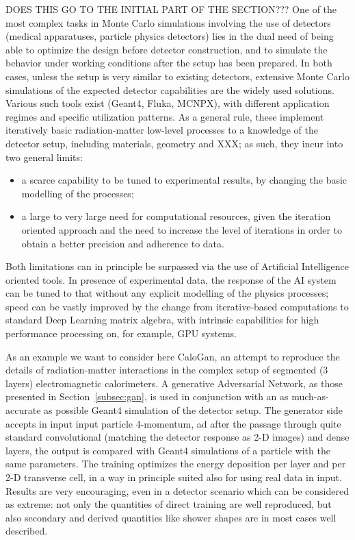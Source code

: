 DOES THIS GO TO THE INITIAL PART OF THE SECTION???
One of the most complex tasks in Monte Carlo simulations involving the use of detectors (medical apparatuses, particle physics detectors) lies in the dual need of being able to optimize the design before detector construction, and to simulate the behavior under working conditions after the setup has been prepared.
In both cases, unless the setup is very similar to existing detectors, extensive Monte Carlo simulations of the expected detector capabilities are the widely used solutions. Various such tools exist (Geant4\cite{g4}, Fluka\cite{fluka}, MCNPX\cite{MCNPX}), with different application regimes and specific utilization patterns. As a general rule, these implement iteratively basic radiation-matter low-level processes to a knowledge of the detector setup, including materials, geometry and  XXX; as such, they incur into two general limits:
\begin{itemize}
\item a scarce capability to be tuned to experimental results, by changing the basic modelling of the processes;
\item a large to very large need for computational resources, given the iteration oriented approach and the need to increase the level of iterations in order to obtain a better precision and adherence to data.
\end{itemize}


Both limitations can in principle be surpassed via the use of Artificial Intelligence oriented tools.
In presence of experimental data, the response of the AI system can be tuned to that without any explicit modelling of the physics processes; speed can be vastly improved by the change from iterative-based computations to standard Deep Learning matrix algebra, with intrinsic capabilities for high performance processing on, for example, GPU systems.

As an example we want to consider here CaloGan\cite{calogan}, an attempt to reproduce the details of radiation-matter interactions in the complex setup of segmented (3 layers) electromagnetic calorimeters.
A generative Adversarial Network, as those presented in Section~\ref{subsec:gan}, is used in conjunction with an as much-as-accurate as possible Geant4 simulation of the detector setup. The generator side accepts in input input particle 4-momentum, ad after the passage through quite standard convolutional (matching the detector response as 2-D images) and dense layers, the output is compared with Geant4 simulations of a particle with the same parameters.  The training optimizes the energy deposition per layer and per 2-D transverse cell, in a way in principle suited also for using real data in input. Results are very encouraging, even in a detector scenario which can be considered as extreme: not only the quantities of direct training are well reproduced, but also secondary and derived quantities like shower shapes are in most cases well described.


